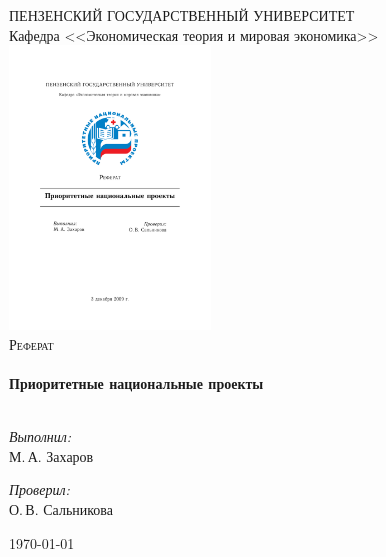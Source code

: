 \thispagestyle{empty}
\begin{center}
  \textsc{\large ПЕНЗЕНСКИЙ ГОСУДАРСТВЕННЫЙ УНИВЕРСИТЕТ}\\[0.5cm]  
Кафедра <<Экономическая теория и мировая экономика>>\\[1.5cm]

\includegraphics[width=0.4\textwidth]{./NPR}\\[1cm]
\textsc{\Large Реферат}\\[0.5cm]
\HRule \\[0.4cm]
{ \LARGE \bfseries Приоритетные национальные проекты}\\[0.4cm]
\HRule \\[1.5cm]
\begin{minipage}{0.4\textwidth}
\begin{flushleft} \large
\emph{Выполнил:}\\
М.\,А. Захаров
\end{flushleft}
\end{minipage}
\begin{minipage}{0.4\textwidth}
\begin{flushright} \large
\emph{Проверил:} \\
О.\,В. Сальникова
\end{flushright}
\end{minipage}
\vfill
{\large \today}
\end{center}
\newpage

